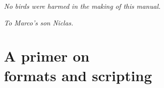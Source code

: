 \documentclass[a4paper,twoside,12pt]{memoir}
\begin{document}
\vspace*{25em}

\begin{flushright}
\em No birds were harmed in the making of this manual.
\end{flushright}






\cleardoublepage

\vspace*{25em}

\begin{flushright}
\em To Marco's son Niclas.
\end{flushright}

\cleardoublepage

\tableofcontents*

\cleardoublepage

\listoffigures*

\cleardoublepage

\listoftables*

\mainmatter

\part[A primer on formats and scripting]{A primer on\\ formats and scripting}
\label{part:primer}

 
\end{document}
